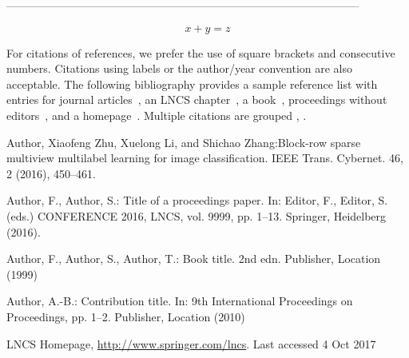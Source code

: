 \documentclass[runningheads]{llncs}
\begin{document}
-----------------------------------------------------------------------------------------------



\begin{equation}
x + y = z
\end{equation}




For citations of references, we prefer the use of square brackets
and consecutive numbers. Citations using labels or the author/year
convention are also acceptable. The following bibliography provides
a sample reference list with entries for journal
articles~\cite{ref_article1}, an LNCS chapter~\cite{ref_lncs1}, a
book~\cite{ref_book1}, proceedings without editors~\cite{ref_proc1},
and a homepage~\cite{ref_url1}. Multiple citations are grouped
\cite{ref_article1,ref_lncs1,ref_book1},
\cite{ref_article1,ref_book1,ref_proc1,ref_url1}.
%
%
%
% 
% 
%
\begin{thebibliography}{8}
Author, Xiaofeng Zhu, Xuelong Li, and Shichao Zhang:Block-row sparse multiview multilabel learning for image classification.  IEEE Trans. Cybernet. 46, 2 (2016), 450–461. 

Author, F., Author, S.: Title of a proceedings paper. In: Editor,
F., Editor, S. (eds.) CONFERENCE 2016, LNCS, vol. 9999, pp. 1--13.
Springer, Heidelberg (2016). 

Author, F., Author, S., Author, T.: Book title. 2nd edn. Publisher,
Location (1999)

Author, A.-B.: Contribution title. In: 9th International Proceedings
on Proceedings, pp. 1--2. Publisher, Location (2010)

LNCS Homepage, \url{http://www.springer.com/lncs}. Last accessed 4
Oct 2017
\end{thebibliography}
\end{document}
